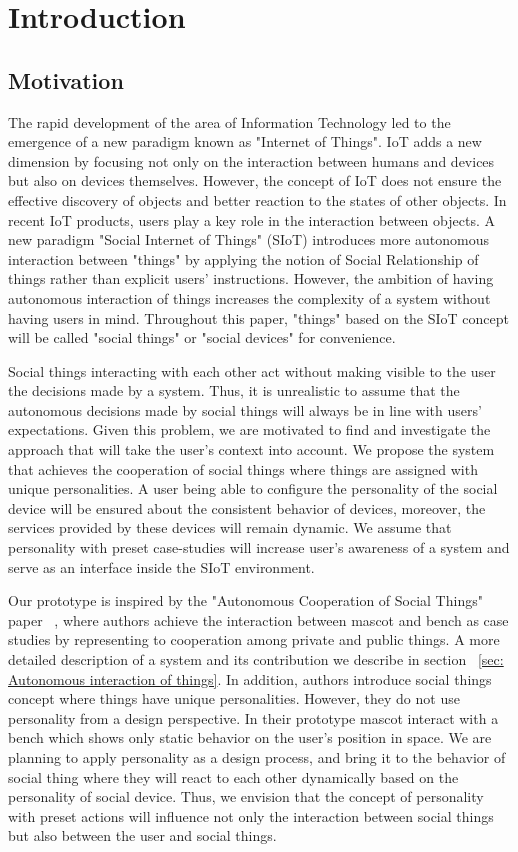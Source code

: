 \chapter{Introduction}
\label{ch:introduction}

\section{Motivation}
\label{sec:motivation}
The rapid development of the area of Information Technology led to the
emergence of a new paradigm known as "Internet of Things".
IoT adds a new dimension by focusing not only on the interaction between
humans and devices but also on devices themselves.
However, the concept of IoT does not ensure the effective discovery of
objects and better reaction to the states of other objects.
In recent IoT products, users play a key role in the interaction between objects.
A new paradigm "Social Internet of Things" (SIoT) introduces more autonomous
interaction between "things" by applying the notion of Social Relationship of
things rather than explicit users' instructions.
However, the ambition of having autonomous interaction of things increases
the complexity of a system without having users in mind.
Throughout this paper, "things" based on the SIoT concept will be called
"social things" or "social devices" for convenience.

Social things interacting with each other act without making visible to the
user the decisions made by a system.
Thus, it is unrealistic to assume that the autonomous decisions made by
social things will always be in line with users' expectations.
Given this problem, we are motivated to find and investigate the approach
that will take the user's context into account.
We propose the system that achieves the cooperation of social things
where things are assigned with unique personalities.
A user being able to configure the personality of the social device will be ensured about
the consistent behavior of devices, moreover, the services provided by these devices will remain dynamic.
We assume that personality with preset case-studies will increase user's
awareness of a system and serve as an interface inside the SIoT environment.

Our prototype is inspired by the "Autonomous Cooperation of Social Things"
paper ~\cite{okada2016autonomous},
where authors achieve the interaction between mascot and bench as case
studies by representing to cooperation among private and public things.
A more detailed description of a system and its contribution we describe
in section ~\ref{sec: Autonomous interaction of things}.
In addition, authors introduce social things concept where things have unique personalities.
However, they do not use personality from a design perspective.
In their prototype mascot interact with a bench which shows only static behavior on the user's position in space.
We are planning to apply personality as a design process, and bring it to the
behavior of social thing where they will react to each other dynamically based on the personality of social device.
Thus, we envision that the concept of personality with preset actions will influence
not only the interaction between social things but also between the user and social things.

